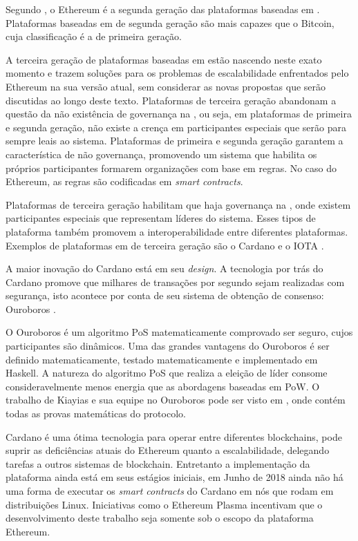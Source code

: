 \documentclass[tcc,capa]{texufpel}
\begin{document}
    Segundo \cite{spurjeonsurvey}, o Ethereum é a segunda geração das plataformas baseadas em \bchain. Plataformas baseadas em \bchain de segunda geração são mais capazes que o Bitcoin, cuja classificação é a de primeira geração. 
    
    A terceira geração de plataformas baseadas em \bchain estão nascendo neste exato momento e trazem soluções para os problemas de escalabilidade enfrentados pelo Ethereum na sua versão atual, sem considerar as novas propostas que serão discutidas ao longo deste texto. Plataformas de terceira geração abandonam a questão da não existência de governança na \bchain, ou seja, em plataformas de primeira e segunda geração, não existe a crença em participantes especiais que serão para sempre leais ao sistema. Plataformas de primeira e segunda geração garantem a característica de não governança, promovendo um sistema que habilita os próprios participantes formarem organizações com base em regras. No caso do Ethereum, as regras são codificadas em \textit{smart contracts}.
    
    Plataformas de terceira geração habilitam que haja governança na \bchain, onde existem participantes especiais que representam líderes do sistema. Esses tipos de plataforma também promovem a interoperabilidade entre diferentes plataformas. Exemplos de plataformas em \bchain de terceira geração são o Cardano e o IOTA \cite{spurjeonsurvey}.
    
    A maior inovação do Cardano está em seu \textit{design}. A tecnologia por trás do Cardano promove que milhares de transações por segundo sejam realizadas com segurança, isto acontece por conta de seu sistema de obtenção de consenso: Ouroboros \cite{kiayias2017ouroboros}.
    
    O Ouroboros é um algoritmo PoS matematicamente comprovado ser seguro, cujos participantes são dinâmicos. Uma das grandes vantagens do Ouroboros é ser definido matematicamente, testado matematicamente e implementado em Haskell. A natureza do algoritmo PoS que realiza a eleição de líder consome consideravelmente menos energia que as abordagens baseadas em PoW. O trabalho de Kiayias e sua equipe no Ouroboros pode ser visto em \cite{kiayias2017ouroboros}, onde contém todas as provas matemáticas do protocolo. 
    
    Cardano é uma ótima tecnologia para operar entre diferentes blockchains, pode suprir as deficiências atuais do Ethereum quanto a escalabilidade, delegando tarefas a outros sistemas de blockchain. Entretanto a implementação da plataforma ainda está em seus estágios iniciais, em Junho de 2018 ainda não há uma forma de executar os \textit{smart contracts} do Cardano em nós que rodam em distribuições Linux. Iniciativas como o Ethereum Plasma incentivam que o desenvolvimento deste trabalho seja somente sob o escopo da plataforma Ethereum.
    
\end{document}
